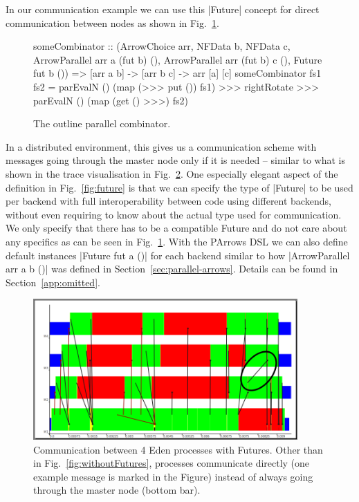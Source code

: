 In our communication example we can use this |Future| concept for direct communication between nodes as shown in Fig.~\ref{fig:someCombinatorParallel}.
\begin{figure}[tbh]
\begin{code}
someCombinator :: (ArrowChoice arr, NFData b, NFData c,
	ArrowParallel arr a (fut b) (), 
	ArrowParallel arr (fut b) c (),
	Future fut b ()) =>
	[arr a b] -> [arr b c] -> arr [a] [c]
someCombinator fs1 fs2 =
	parEvalN () (map (>>> put ()) fs1) >>>
	rightRotate >>>
	parEvalN () (map (get () >>>) fs2)
\end{code}
\caption{The outline parallel combinator.}
\label{fig:someCombinatorParallel}
\end{figure}
In a distributed environment, this gives us a communication scheme with messages going through the master node only if it is needed -- similar to what is shown in the trace visualisation in Fig.~\ref{fig:withFutures}. One especially elegant aspect of the definition in Fig.~\ref{fig:future} is that we can specify the type of |Future| to be used per backend with full interoperability between code using different backends, without even requiring to know about the actual type used for communication. We only specify that there has to be a compatible Future and do not care about any specifics as can be seen in Fig.~\ref{fig:someCombinatorParallel}. With the PArrows DSL we can also define default instances |Future fut a ()| for each backend similar to how |ArrowParallel arr a b ()| was defined in Section~\ref{sec:parallel-arrows}. Details can be found in Section~\ref{app:omitted}. 
\begin{figure}[ht]
	\centering
	\includegraphics[width=0.9\textwidth]{images/withFutures}
	\caption[with Futures]{Communication between 4 Eden processes with Futures. Other than in Fig.~\ref{fig:withoutFutures}, processes communicate directly (one example message is marked in the Figure) instead of always going through the master node (bottom bar).}
	\label{fig:withFutures}
\end{figure}
